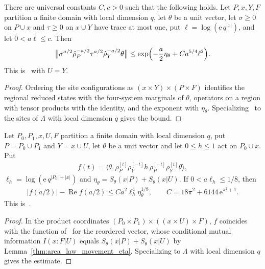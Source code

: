 \begin{lemma}
    \label{thm:area_law_lattice_movement}
    \leanok
    There are universal constants $C,c>0$ such that the following holds. Let
    $P,x,Y,F$ partition a finite domain with local dimension $q$, let $\theta$
    be a unit vector, let $\sigma\ge0$ on $P\cup x$ and $\tau\ge0$ on
    $x\cup Y$ have trace at most one, put $\ell=\log(\mathrm e\,q^{|x|})$, and
    let $0<a\ell\le c$. Then
    \begin{align}
        \bigl\|\sigma^{a/2}\hat\rho_P^{-a/2}\tau^{a/2}\hat\rho_Y^{-a/2}\theta\bigr\|
        \le\exp\Bigl(-\frac a2\eta_\theta+Ca^{5/4}\ell^2\Bigr).
    \end{align}
    This is~\cite[Lemma~5.1]{OpenAI2026AreaLaw} with $U=Y$.
\end{lemma}
\begin{proof}\leanok
    Ordering the site configurations as $(x\times Y)\times(P\times F)$
    identifies the regional reduced states with the four-system marginals of
    $\theta$, operators on a region with tensor products with the identity,
    and the exponent with $\eta_\theta$. Specializing~\cite[Lemma~5.1]{OpenAI2026AreaLaw}
    to the sites of $\Lambda$ with local dimension $q$ gives the bound.
\end{proof}

\begin{lemma}
    \label{thm:area_law_lattice_skew}
    \leanok
    Let $P_0,P_1,x,U,F$ partition a finite domain with local dimension $q$, put
    $P=P_0\cup P_1$ and $Y=x\cup U$, let $\theta$ be a unit vector and let
    $0\le h\le1$ act on $P_0\cup x$. Put
    \begin{align}
        f(t)=\bigl\langle\theta,\rho_P^{[t]}\rho_Y^{[-t]}h\,\rho_P^{[-t]}\rho_Y^{[t]}\theta\bigr\rangle,
    \end{align}
    $\ell_h=\log(\mathrm e\,q^{|P_0|+|x|})$ and
    $\eta_\theta=S_\theta(x|P)+S_\theta(x|U)$. If $0<a\ell_h\le1/8$, then
    \begin{align}
        |f(a/2)|-\operatorname{Re}f(a/2)\le Ca^2\ell_h^4\eta_\theta^{1/8},
        \qquad C=18\pi^2+6144\,\mathrm e^{\pi^2+1}.
    \end{align}
    This is~\cite[Lemma~5.3]{OpenAI2026AreaLaw}.
\end{lemma}
\begin{proof}\leanok
    In the product coordinates $(P_0\times P_1)\times((x\times U)\times F)$,
    $f$ coincides with the function of~\cite[Lemma~5.3]{OpenAI2026AreaLaw} for
    the reordered vector, whose conditional mutual information $I(x:F|U)$
    equals $S_\theta(x|P)+S_\theta(x|U)$ by Lemma~\ref{thm:area_law_movement_eta}.
    Specializing to $\Lambda$ with local dimension $q$ gives the estimate.
\end{proof}
